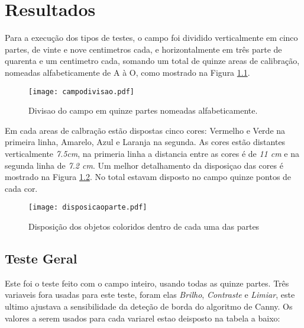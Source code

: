 \chapter{Resultados} 

Para a execução dos tipos de testes, o campo foi dividido verticalmente em cinco partes, de vinte e nove centimetros cada, e horizontalmente em três parte de quarenta e um centimetro cada, somando um total de quinze areas de calibração, nomeadas alfabeticamente de A à O, como mostrado na Figura \ref{campodivisao}.

\begin{figure}[!: h]
		\centering
		\texttt{[image: campodivisao.pdf]}
		\caption{Divisao do campo em quinze partes nomeadas alfabeticamente.}
		\label{campodivisao}
	\end{figure}
	
Em cada areas de calbração estão dispostas cinco cores: Vermelho  e Verde na primeira linha, Amarelo, Azul e Laranja na segunda. As cores estão distantes verticalmente \textit{7.5cm}, na primeria linha a distancia entre as cores é  de \textit{11 cm} e na segunda linha de \textit{7.2 cm}. Um  melhor detalhamento da disposiçao das cores é  mostrado na Figura \ref{disposicaoparte}. No total estavam disposto no campo quinze pontos de cada cor.

\begin{figure}[!: h]
		\centering
		\texttt{[image: disposicaoparte.pdf]}
		\caption{Disposição dos objetos coloridos dentro de cada uma das partes}
		\label{disposicaoparte}
	\end{figure}
	\newpage
\section{Teste Geral}
Este foi o teste feito com o campo inteiro, usando todas as quinze partes. Três variaveis fora usadas para este teste, foram elas \textit{Brilho}, \textit{Contraste} e  \textit{Limiar}, este ultimo ajustava a sensibilidade da deteção de borda do algoritmo de Canny. Os valores a serem usados para cada variarel estao deisposto na tabela a baixo:

